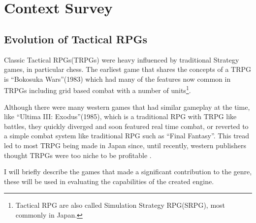 
\section{Context Survey} 
\label{sec:context_survey}

\subsection{Evolution of Tactical RPGs }
\label{sub:evolution_of_tactical_rpgs_}

Classic Tactical RPGs(TRPGs)  were heavy influenced by traditional Strategy games, in particular chess.  The earliest game that shares the concepts of a TRPG is ``Bokosuka Wars''(1983) which had many of the features now common in TRPGs including grid based combat with a number of units\cite{BokosukaWars}\footnote{Tactical RPG are also called Simulation Strategy RPG(SRPG),  most commonly in Japan.}. 

Although there were many western games that had similar gameplay at the time, like ``Ultima III: Exodus''(1985), which is a traditional RPG with TRPG like battles, they quickly diverged and soon featured real time combat, or reverted to a simple combat system like traditional RPG such as ``Final Fantasy''.  This tread led to most TRPG being made in Japan since, until recently, western publishers  thought TRPGs were too niche to be profitable \cite{notrpg}. 

I will briefly describe  the games that made a significant contribution to the genre, these will be used in evaluating the capabilities of the created engine.

